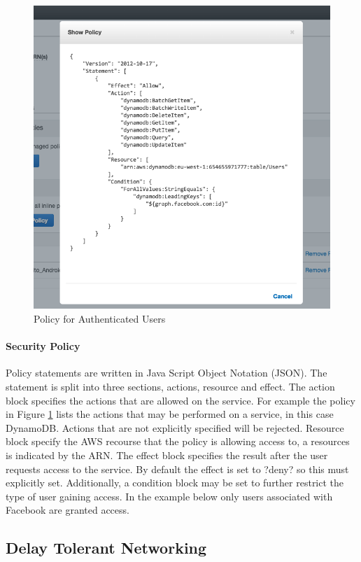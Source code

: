 \documentclass[a4paper, 11pt]{article}
\begin{document}
\begin{figure}[t]
\centering
\includegraphics[width=\textwidth]{iam_policy.png}
\caption{Policy for Authenticated Users}\label{fig:iam}
\end{figure}

\paragraph{Security Policy}Policy statements are written in Java Script Object Notation (JSON). The statement is split into three sections, actions, resource and effect. The action block specifies the actions that are allowed on the service. For example the policy in Figure \ref{fig:iam} lists the actions that may be performed on a service, in this case DynamoDB. Actions that are not explicitly specified will be rejected. Resource block specify the AWS recourse that the policy is allowing access to, a resources is indicated by the ARN. The effect block specifies the result after the user requests access to the service. By default the effect is set to ?deny? so this must explicitly set. Additionally, a condition block may be set to further restrict the type of user gaining access. In the example below only users associated with Facebook are granted access.

\subsection{Delay Tolerant Networking}\
\label{sec:Delay Tolerant Networking}
\end{document}
